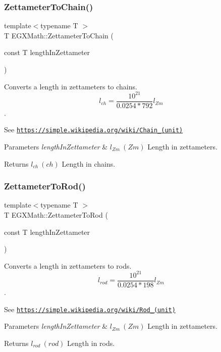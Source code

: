 \subsubsection{\texorpdfstring{Zettameter\+To\+Chain()}{ZettameterToChain()}}
{\footnotesize\ttfamily template$<$typename T $>$ \\
T E\+G\+X\+Math\+::\+Zettameter\+To\+Chain (\begin{DoxyParamCaption}\item[{const T}]{length\+In\+Zettameter }\end{DoxyParamCaption})}



Converts a length in zettameters to chains. \[ l_{ch}= \frac{10^{21}}{0.0254 * 792} l_{Zm} \]. 

See \href{https://simple.wikipedia.org/wiki/Chain_(unit)}{\tt https\+://simple.\+wikipedia.\+org/wiki/\+Chain\+\_\+(unit)} 
\begin{DoxyParams}{Parameters}
{\em length\+In\+Zettameter} & $ l_{Zm}\ (Zm)$ Length in zettameters. \\
\hline
\end{DoxyParams}
\begin{DoxyReturn}{Returns}
$ l_{ch}\ (ch)$ Length in chains. 
\end{DoxyReturn}
\mbox{\label{group___e_g_x_math-_conversions-_length_conversions-_zettameter-_surveyors_gac9031bf1465b8a56ab426ac20d256741}} 
\subsubsection{\texorpdfstring{Zettameter\+To\+Rod()}{ZettameterToRod()}}
{\footnotesize\ttfamily template$<$typename T $>$ \\
T E\+G\+X\+Math\+::\+Zettameter\+To\+Rod (\begin{DoxyParamCaption}\item[{const T}]{length\+In\+Zettameter }\end{DoxyParamCaption})}



Converts a length in zettameters to rods. \[ l_{rod}= \frac{10^{21}}{0.0254 * 198} l_{Zm} \]. 

See \href{https://simple.wikipedia.org/wiki/Rod_(unit)}{\tt https\+://simple.\+wikipedia.\+org/wiki/\+Rod\+\_\+(unit)} 
\begin{DoxyParams}{Parameters}
{\em length\+In\+Zettameter} & $ l_{Zm}\ (Zm)$ Length in zettameters. \\
\hline
\end{DoxyParams}
\begin{DoxyReturn}{Returns}
$ l_{rod}\ (rod)$ Length in rods. 
\end{DoxyReturn}
